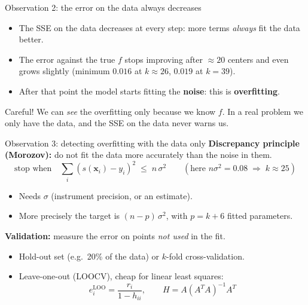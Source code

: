 \documentclass[10pt,aspectratio=169]{beamer}
\newcommand{\hl}[1]{\textcolor{accent}{\textbf{#1}}}
\newcommand{\x}{\bm{x}}
\begin{document}
\begin{frame}{Observation 2: the error on the data always decreases}
  \begin{itemize}
    \item The SSE on the data decreases at every step: more terms
          \emph{always} fit the data better.
    \item The error against the true $f$ stops improving after
          $\approx 20$ centers and even grows slightly
          (minimum $0.016$ at $k\approx 26$, $0.019$ at $k=39$).
    \item After that point the model starts fitting the \hl{noise}:
          this is \hl{overfitting}.
  \end{itemize}
  \vspace{0.5em}
  \begin{alertblock}{Careful!}
    We can \emph{see} the overfitting only because we know $f$. In a real
    problem we only have the data, and the SSE on the data never warns us.
  \end{alertblock}
\end{frame}

\begin{frame}{Observation 3: detecting overfitting with the data only}
  \textbf{Discrepancy principle (Morozov):} do not fit the data more
  accurately than the noise in them.
  \[
    \text{stop when}\quad \textstyle\sum_i (s(\x_i)-y_i)^2 \;\le\; n\,\sigma^2
    \qquad (\text{here } n\sigma^2 = 0.08 \;\Rightarrow\; k \approx 25)
  \]
  \begin{itemize}
    \item Needs $\sigma$ (instrument precision, or an estimate).
    \item More precisely the target is $(n-p)\,\sigma^2$, with $p = k+6$
          fitted parameters.
  \end{itemize}
  \textbf{Validation:} measure the error on points \emph{not used} in the fit.
  \begin{itemize}
    \item Hold-out set (e.g.\ 20\% of the data) or $k$-fold cross-validation.
    \item Leave-one-out (LOOCV), cheap for linear least squares:
          \[
            e_i^{\text{LOO}} = \frac{r_i}{1 - h_{ii}}, \qquad
            H = A(A^TA)^{-1}A^T
          \]
  \end{itemize}
\end{frame}
\end{document}
